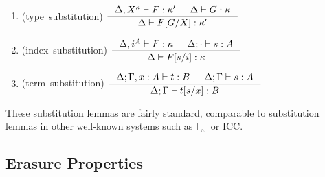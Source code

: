 \documentclass{llncs}
\newcommand{\Fw}{\ensuremath{\mathsf{F}_\omega}}
\begin{document}
\begin{lemma}[substitution]\mbox{}\\[-3mm]
\label{lem:subst}
\begin{enumerate}
\item
\label{lem:tysubst}
\mbox{\rm (type substitution)}
$\inference{\Delta,X^\kappa |- F:\kappa' & \Delta |- G:\kappa}
        {\Delta |- F[G/X]:\kappa'} $
\medskip

\item
\label{lem:ixsubst}
\mbox{\rm (index substitution)}
$ \inference{\Delta,i^A |- F:\kappa & \Delta;\cdot |- s:A}
        {\Delta |- F[s/i]:\kappa} $
\medskip

\item
\label{lem:tmsubst}
\mbox{\rm (term substitution)}
$ \inference{\Delta;\Gamma,x:A |- t:B & \Delta;\Gamma |- s:A}
        {\Delta;\Gamma |- t[s/x]:B} $
\end{enumerate}
\end{lemma}
These substitution lemmas are fairly standard,
comparable to substitution lemmas
in other well-known systems such as \Fw\ or ICC.


\subsection{Erasure Properties} \label{ssec:erasure}
\end{document}
